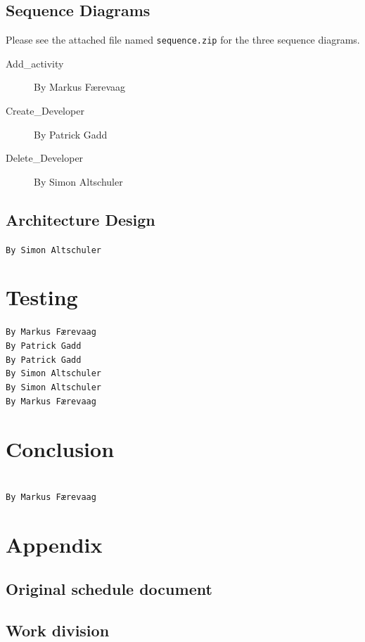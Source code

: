 \documentclass[danish]{article}
\newcommand{\code}[1]{\texttt{#1}}
\begin{document}
\subsection{Sequence Diagrams}
Please see the attached file named \code{sequence.zip} for the three sequence diagrams. 
\begin{description}
\item[Add\_activity] By Markus Færevaag
\item[Create\_Developer] By Patrick Gadd
\item[Delete\_Developer] By Simon Altschuler
\end{description}

\subsection{Architecture Design}
\texttt{By Simon Altschuler}\\


\section{Testing}

\texttt{By Markus Færevaag}\\

\texttt{By Patrick Gadd}\\

\texttt{By Patrick Gadd}\\

\texttt{By Simon Altschuler}\\

\texttt{By Simon Altschuler}\\

\texttt{By Markus Færevaag}\\


\section{Conclusion}
 \\
\texttt{By Markus Færevaag}

\section{Appendix}
\subsection{Original schedule document}

\subsection{Work division}

\end{document}
